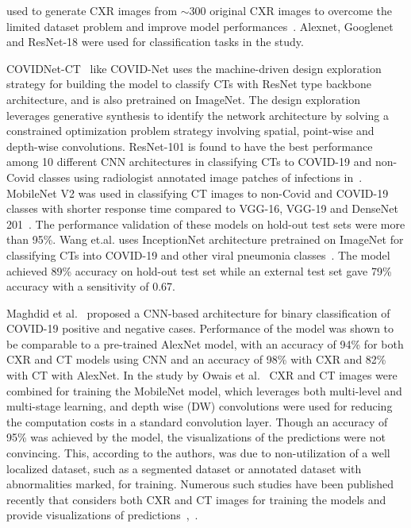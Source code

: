 \documentclass[10pt,journal,compsoc]{IEEEtran}
\begin{document}
used to generate CXR images from \begin{math}\sim300\end{math} original CXR images to overcome the limited dataset problem and improve model performances~\cite{loey2020within}. Alexnet, Googlenet and ResNet-18 were used for classification tasks in the study. 

COVIDNet-CT~\cite{gunraj2020covidnet} like COVID-Net uses the machine-driven design exploration strategy for building the model to classify CTs with ResNet type backbone architecture, and is also pretrained on ImageNet. The design exploration leverages generative synthesis to identify the network architecture by solving a constrained optimization problem strategy involving spatial, point-wise and depth-wise convolutions. ResNet-101 is found to have the best performance among 10 different CNN architectures in classifying CTs to COVID-19 and non-Covid classes using radiologist annotated image patches of infections in~\cite{ardakani2020application}. MobileNet V2 was used in classifying CT images to non-Covid and COVID-19 classes with shorter response time compared to VGG-16, VGG-19 and DenseNet 201~\cite{singh2022deep}. The performance validation of these models on hold-out test sets were more than 95\%. Wang et.al. uses InceptionNet architecture pretrained on ImageNet for classifying CTs into COVID-19 and other viral pneumonia classes~\cite{wang2021deep}. The model achieved 89\% accuracy on hold-out test set while an external test set gave 79\% accuracy with a sensitivity of 0.67. 

Maghdid et al.~\cite{maghdid2021diagnosing} proposed a CNN-based architecture for binary classification of COVID-19 positive and negative cases. Performance of the model was shown to be comparable to a pre-trained AlexNet model, with an accuracy of 94\% for both CXR and CT models using CNN and an accuracy of 98\% with CXR and 82\% with CT with AlexNet. In the study by Owais et al.~\cite{owais2021multilevel} CXR and CT images were combined for training the MobileNet model, which leverages both multi-level and multi-stage learning, and depth wise (DW) convolutions were used for reducing the computation costs in a standard convolution layer. Though an accuracy of 95\% was achieved by the model, the visualizations of the predictions were not convincing. This, according to the authors, was due to non-utilization of a well localized dataset, such as a segmented dataset or annotated dataset with abnormalities marked, for training. Numerous such studies have been published recently that considers both CXR and CT images for training the models and provide visualizations of predictions~\cite{panwar2020deep},~\cite{jia2021classification}.
\end{document}
